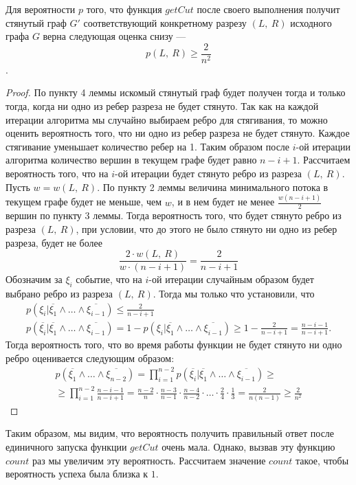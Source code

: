 \documentclass[a4paper,12pt]{article}
\begin{document}
\begin{theorem}
 Для вероятности $p$ того, что функция $getCut$ после своего выполнения получит стянутый граф $G'$ соответствующий конкретному разрезу $(L,\ R)$ исходного графа $G$ верна следующая оценка снизу — \[p(L,\ R) \geqslant \frac{2}{n^2}\].
\end{theorem}
\begin{proof}
По пункту 4 леммы искомый стянутый граф будет получен тогда и только тогда, когда ни одно из ребер разреза не будет стянуто. Так как на каждой итерации алгоритма мы случайно выбираем ребро для стягивания, то можно оценить вероятность того, что ни одно из ребер разреза не будет стянуто. Каждое стягивание уменьшает количество ребер на 1. Таким образом после $i$-ой итерации алгоритма количество вершин в текущем графе будет равно $n - i + 1$. Рассчитаем вероятность того, что на $i$-ой итерации будет стянуто ребро из разреза $(L,\ R)$. Пусть $w = w(L,\ R)$. По пункту 2 леммы величина минимального потока в текущем графе будет не меньше, чем $w$, и в нем будет не менее $\frac{w(n-i+1)}{2}$ вершин по пункту 3 леммы. Тогда вероятность того, что будет стянуто ребро из разреза $(L,\ R)$, при условии, что до этого не было стянуто ни одно из ребер разреза, будет не более \[\frac{2\cdot w(L,\ R)}{w\cdot (n-i+1)}=\frac{2}{n-i+1}\]
Обозначим за $\xi_i$ событие, что на $i$-ой итерации случайным образом будет выбрано ребро из разреза $(L,\ R)$. Тогда мы только что установили, что
\begin{gather*}
p(\xi_i | \overline{\xi_1} \wedge \ldots \wedge \overline{\xi_{i-1}}) \leqslant \frac{2}{n-i+1}\\
p(\overline{\xi_i} | \overline{\xi_1} \wedge \ldots \wedge \overline{\xi_{i-1}}) = 1 - p(\xi_i | \overline{\xi_1} \wedge \ldots \wedge \overline{\xi_{i-1}}) \geqslant 1 - \frac{2}{n-i+1} = \frac{n-i-1}{n-i+1}.
\end{gather*}
Тогда вероятность того, что во время работы функции не будет стянуто ни одно ребро оценивается следующим образом:
\begin{gather*}
p(\overline{\xi_1} \wedge \ldots \wedge \overline{\xi_{n-2}}) = \prod\limits_{i=1}^{n-2} p(\overline{\xi_i} | \overline{\xi_1} \wedge \ldots \wedge \overline{\xi_{i-1}}) \geqslant\\
\geqslant \prod\limits_{i=1}^{n-2} \frac{n-i-1}{n-i+1} = \frac{n - 2}{n} \cdot \frac{n-3}{n-1} \cdot \frac{n-4}{n-2} \cdot \ldots \cdot \frac{2}{4} \cdot \frac{1}{3} = \frac{2}{n(n-1)} \geqslant \frac{2}{n^2}
\end{gather*}
\end{proof}
Таким образом, мы видим, что вероятность получить правильный ответ после единичного запуска функции $getCut$ очень мала. Однако, вызвав эту функцию $count$ раз мы увеличим эту вероятность. Рассчитаем значение $count$ такое, чтобы вероятность успеха была близка к $1$.
\end{document}

